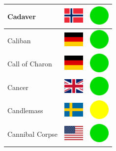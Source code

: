\documentclass[12pt, a4paper, twoside]{report}
\begin{document}
\begin{center}
\begin{longtable}{|p{5cm}|p{2cm}|p{2cm}|}
 Cadaver                                                    & \includegraphics[width=1cm]{4x3/no} &   \includegraphics[width=1cm]{likes/y} \\ \hline
 Caliban                                                    & \includegraphics[width=1cm]{4x3/de} &   \includegraphics[width=1cm]{likes/y} \\ \hline
 Call of Charon                                             & \includegraphics[width=1cm]{4x3/de} &   \includegraphics[width=1cm]{likes/y} \\ \hline
 Cancer                                                     & \includegraphics[width=1cm]{4x3/gb} &   \includegraphics[width=1cm]{likes/y} \\ \hline
 Candlemass                                                 & \includegraphics[width=1cm]{4x3/se} &   \includegraphics[width=1cm]{likes/m} \\ \hline
 Cannibal Corpse                                            & \includegraphics[width=1cm]{4x3/us} &   \includegraphics[width=1cm]{likes/y} \\ \hline

\end{longtable}
\end{center}
\end{document}
